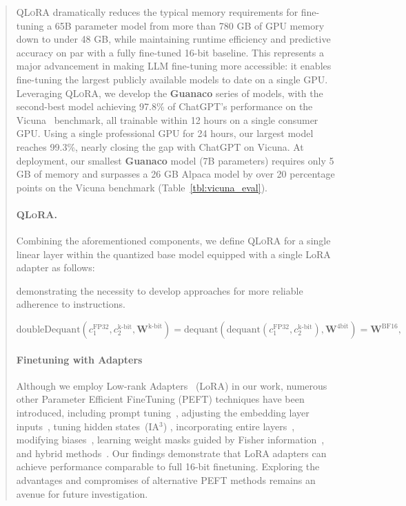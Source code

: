 \begin{quote}
\textsc{QLoRA} dramatically reduces the typical memory requirements for fine-tuning a 65B parameter model from more than 780 GB of GPU memory down to under 48 GB, while maintaining runtime efficiency and predictive accuracy on par with a fully fine-tuned 16-bit baseline. This represents a major advancement in making LLM fine-tuning more accessible: it enables fine-tuning the largest publicly available models to date on a single GPU. Leveraging \textsc{QLoRA}, we develop the \textbf{Guanaco} series of models, with the second-best model achieving 97.8\% of ChatGPT’s performance on the Vicuna~\citep{vicuna2023} benchmark, all trainable within 12 hours on a single consumer GPU. Using a single professional GPU for 24 hours, our largest model reaches 99.3\%, nearly closing the gap with ChatGPT on Vicuna. At deployment, our smallest \textbf{Guanaco} model (7B parameters) requires only 5 GB of memory and surpasses a 26 GB Alpaca model by over 20 percentage points on the Vicuna benchmark (Table~\ref{tbl:vicuna_eval}).

\paragraph{\textsc{QLoRA}.} Combining the aforementioned components, we define \textsc{QLoRA} for a single linear layer within the quantized base model equipped with a single LoRA adapter as follows:

demonstrating the necessity to develop approaches for more reliable adherence to instructions.

\begin{equation}
    \text{doubleDequant}(c_1^{\text{FP32}}, c_2^{\text{k-bit}}, \mathbf{W}^{\text{k-bit}}) = \text{dequant}(\text{dequant}(c_1^{\text{FP32}}, c_2^{\text{k-bit}}), \mathbf{W}^{\text{4bit}}) = \mathbf{W}^{\text{BF16}},
\end{equation}

\paragraph{Finetuning with Adapters} Although we employ Low-rank Adapters~\citep{hu2021lora} (LoRA) in our work, numerous other Parameter Efficient FineTuning (PEFT) techniques have been introduced, including prompt tuning~\citep{qin2021learning,lester2021power,li2021prefix}, adjusting the embedding layer inputs~\citep{an2022input}, tuning hidden states~(IA$^3$) \citep{liu2022few}, incorporating entire layers~\citep{houlsby2019parameter}, modifying biases~\citep{zaken2021bitfit}, learning weight masks guided by Fisher information~\citep{sung2021training}, and hybrid methods~\citep{henderson2021compacter}. Our findings demonstrate that LoRA adapters can achieve performance comparable to full 16-bit finetuning. Exploring the advantages and compromises of alternative PEFT methods remains an avenue for future investigation.


\end{quote}
